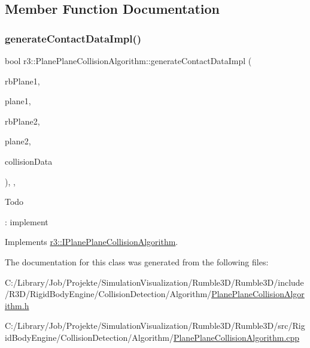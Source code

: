 \subsection{Member Function Documentation}
\mbox{\label{classr3_1_1_plane_plane_collision_algorithm_a33400ba57a8c0550ada0778bb92eeb69}} 
\subsubsection{\texorpdfstring{generate\+Contact\+Data\+Impl()}{generateContactDataImpl()}}
{\footnotesize\ttfamily bool r3\+::\+Plane\+Plane\+Collision\+Algorithm\+::generate\+Contact\+Data\+Impl (\begin{DoxyParamCaption}\item[{\mbox{\hyperlink{classr3_1_1_rigid_body}{Rigid\+Body}} $\ast$}]{rb\+Plane1,  }\item[{\mbox{\hyperlink{classr3_1_1_collision_plane}{Collision\+Plane}} $\ast$}]{plane1,  }\item[{\mbox{\hyperlink{classr3_1_1_rigid_body}{Rigid\+Body}} $\ast$}]{rb\+Plane2,  }\item[{\mbox{\hyperlink{classr3_1_1_collision_plane}{Collision\+Plane}} $\ast$}]{plane2,  }\item[{\mbox{\hyperlink{classr3_1_1_collision_data}{Collision\+Data}} \&}]{collision\+Data }\end{DoxyParamCaption})\hspace{0.3cm}{\ttfamily [override]}, {\ttfamily [protected]}, {\ttfamily [virtual]}}

\begin{DoxyRefDesc}{Todo}
\item[\mbox{\hyperlink{todo__todo000016}{Todo}}]\+: implement \end{DoxyRefDesc}


Implements \mbox{\hyperlink{classr3_1_1_i_plane_plane_collision_algorithm_a708dec70f58b4476976dfea9921d1524}{r3\+::\+I\+Plane\+Plane\+Collision\+Algorithm}}.



The documentation for this class was generated from the following files\+:\begin{DoxyCompactItemize}
\item 
C\+:/\+Library/\+Job/\+Projekte/\+Simulation\+Visualization/\+Rumble3\+D/\+Rumble3\+D/include/\+R3\+D/\+Rigid\+Body\+Engine/\+Collision\+Detection/\+Algorithm/\mbox{\hyperlink{_plane_plane_collision_algorithm_8h}{Plane\+Plane\+Collision\+Algorithm.\+h}}\item 
C\+:/\+Library/\+Job/\+Projekte/\+Simulation\+Visualization/\+Rumble3\+D/\+Rumble3\+D/src/\+Rigid\+Body\+Engine/\+Collision\+Detection/\+Algorithm/\mbox{\hyperlink{_plane_plane_collision_algorithm_8cpp}{Plane\+Plane\+Collision\+Algorithm.\+cpp}}\end{DoxyCompactItemize}
